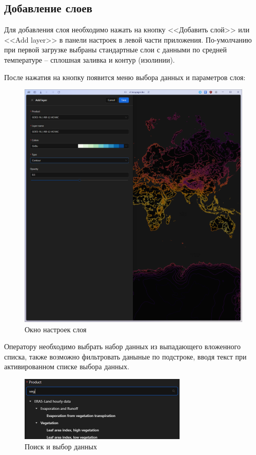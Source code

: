 \documentclass[a4paper, 12pt]{article}
\begin{document}
	\subsection{Добавление слоев}
	Для добавления слоя необходимо нажать на кнопку <<Добавить слой>> или <<Add layer>> в панели настроек в левой части
	приложения. По-умолчанию при первой загрузке выбраны стандартные слои с данными по средней температуре -- сплошная
	заливка и контур (изолинии).

	После нажатия на кнопку появится меню выбора данных и параметров слоя:
	\begin{figure}[!h]
		\centering
		\includegraphics[width=15cm]{./assets/pic2.png}
		\caption{Окно настроек слоя}
	\end{figure}

	Оператору необходимо выбрать набор данных из выпадающего вложенного списка, также возможно фильтровать даныные по подстроке,
	вводя текст при активированном списке выбора данных.

	\begin{figure}[h!]
		\centering
		\includegraphics[width=8cm]{./assets/pic3.png}
		\caption{Поиск и выбор данных}
	\end{figure}
\end{document}
